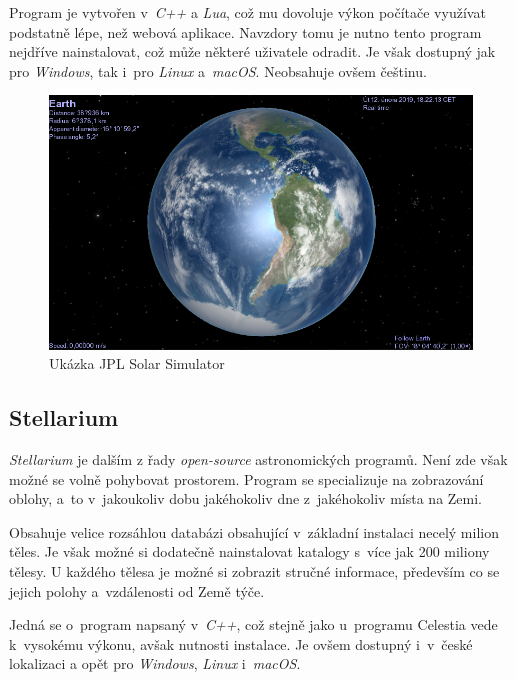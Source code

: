 \documentclass[a4paper,12pt]{article}
\begin{document}
Program je vytvořen v~\textit{C++} a \textit{Lua}, což mu dovoluje výkon počítače využívat podstatně lépe, než webová aplikace. Navzdory tomu je nutno tento program nejdříve nainstalovat, což může některé uživatele odradit. Je však dostupný jak pro \textit{Windows}, tak i~pro \textit{Linux} a~\textit{macOS}. Neobsahuje ovšem češtinu. 

\begin{figure}[H]
  \centering
  \includegraphics[width=450pt]{Images/Celestia.png}
  \caption[Ukázka JPL Solar System Simulator]{Ukázka JPL Solar Simulator   \footnotemark[1]}
\end{figure}


\subsection{Stellarium}

\textit{Stellarium} je dalším z řady \textit{open-source} astronomických programů. Není zde však možné se volně pohybovat prostorem. Program se specializuje na zobrazování oblohy, a~to v~jakoukoliv dobu jakéhokoliv dne z~jakéhokoliv místa na Zemi.

Obsahuje velice rozsáhlou databázi obsahující v~základní instalaci necelý milion těles. Je však možné si dodatečně nainstalovat katalogy s~více jak 200 miliony tělesy. U každého tělesa je možné si zobrazit stručné informace, především co se jejich polohy a~vzdálenosti od Země týče.

Jedná se o~program napsaný v~\textit{C++}, což stejně jako u~programu Celestia vede k~vysokému výkonu, avšak nutnosti instalace. Je ovšem dostupný i~v~české lokalizaci a opět pro \textit{Windows}, \textit{Linux} i~\textit{macOS}.
\end{document}
